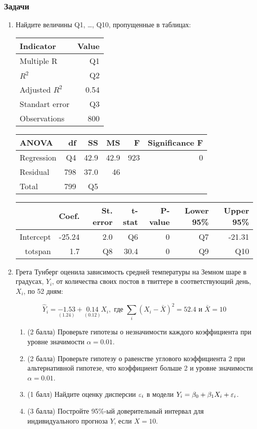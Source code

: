 \subsubsection*{Задачи}

\begin{enumerate}
\item Найдите величины Q1, \ldots, Q10, пропущенные в таблицах: 

\begin{tabular}{lr} \toprule
Indicator & Value \\
\midrule
Multiple R          & Q1 \\
$R^2$     			& Q2 \\
Adjusted $R^2$     	& 0.54 \\
Standart error 		& Q3 \\
Observations		& 800 \\
\bottomrule
\end{tabular}\hspace{2cm}
\begin{tabular}{lrrrrr} \toprule
ANOVA     	 &  df 	& SS		& MS 	& F & Significance F \\
\midrule
Regression   & Q4   	& 42.9  	& 42.9	&  923 	& 	0	\\
Residual     & 798  	& 37.0  	& 46	&  	&     	\\
Total        & 799  	& Q5        &    	&  	&     	\\
\bottomrule
\end{tabular}


\begin{tabular}{rrrrrrr}
\toprule
 			& Coef. 	& St. error	& t-stat & P-value	& Lower 95\% 	& Upper 95\% \\
\midrule
Intercept 	& -25.24 	& 2.0 	& Q6 		& 0 	&  Q7		& -21.31 \\
totspan		& 1.7		& Q8    & 30.4 	    & 0 	&  Q9	    & Q10 \\
\bottomrule
\end{tabular}


\item Грета Тунберг оценила зависимость средней температуры на Земном шаре в градусах, $Y_i$, 
от количества своих постов в твиттере в соответствующий день, $X_i$, по 52 дням:

\[
\hat Y_i = \underset{(1.24)}{-1.53} + \underset{(0.12)}{0.14} X_i, \text{ где } \sum_i (X_i - \bar X)^2 =52.4 \text{ и } \bar X = 10
\]

\begin{enumerate}
\item (2 балла) Проверьте гипотезы о незначимости каждого коэффициента при уровне значимости $\alpha = 0.01$.
\item (2 балла) Проверьте гипотезу о равенстве углового коэффициента 2 при альтернативной гипотезе, что 
коэффициент больше 2 и уровне значимости $\alpha = 0.01$.
\item (1 балл) Найдите оценку дисперсии $\varepsilon_i$ в модели $Y_i = \beta_0 + \beta_1 X_i + \varepsilon_i$.
\item (3 балла) Постройте 95\%-ый доверительный интервал для индивидуального прогноза $Y$, если $X=10$.
    

\end{enumerate}
\end{enumerate}
